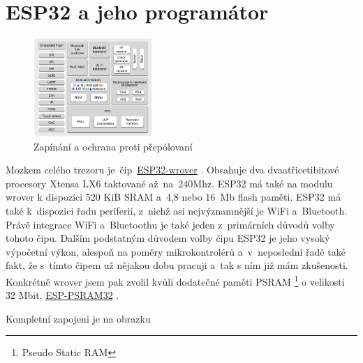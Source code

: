 \section{ESP32 a jeho programátor}

\begin{figure}
    \centering
    \includegraphics[width=0.4\textwidth]{kapitoly/obrazky/E4/ESP32/BlockDiagram.png}
    \caption{\label{fig:E4-ESP32-BlockDiagram}Zapínání a ochrana proti přepólovaní}
\end{figure}

Mozkem celého trezoru je~čip~\href{https://www.espressif.com/sites/default/files/documentation/esp32-wrover-b_datasheet_en.pdf}{ESP32-wrover} \parencite{ESP32-WROVER-B}. 
Obsahuje dva dvaatřicetibitové procesory Xtensa LX6 taktované až~na~240Mhz. ESP32 \parencite{ESP32} má také na modulu wrover k dispozici 520 KiB SRAM 
a~4,8 nebo 16~Mb flash paměti. ESP32 má také k~dispozici řadu periferií, z~nichž asi nejvýznamnější je WiFi a~Bluetooth. Právě integrace 
WiFi a~Bluetoothu je také jeden z~primárních důvodů volby tohoto čipu. Dalším podstatným důvodem volby čipu ESP32 je jeho vysoký výpočetní výkon, 
alespoň na poměry mikrokontrolérů a~v~neposlední řadě také fakt, že s~tímto čipem už nějakou dobu pracuji a~tak s ním již mám zkušenosti. 
Konkrétně wrover jsem pak zvolil kvůli dodatečné paměti PSRAM \footnote{Pseudo Static RAM} o velikosti 32 Mbit, 
\href{http://gamma.spb.ru/images/pdf/esp-psram32_datasheet_en.pdf}{ESP-PSRAM32} \parencite{ESP-PSRAM32}.

Kompletní zapojeni je na obrazku 

